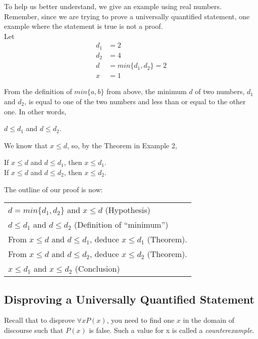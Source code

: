 To help us better understand, we give an example using real numbers.  Remember, since we are trying to prove a universally quantified statement, one example where the statement is true is not a proof.\\

Let
\begin{align*}
    d_1 &= 2\\
    d_2 &= 4\\
    d &= min\{d_1, d_2\} = 2\\
    x &= 1
\end{align*}

From the definition of $min\{a, b\}$ from above, the minimum $d$ of two numbers, $d_1$ and $d_2$, is equal to one of the two numbers and less than or equal to the other one.  In other words,
\begin{center}
    $d \leq d_1$ and $d \leq d_2$.  
\end{center}

We know that $x \leq d$, so, by the Theorem in Example 2,

\begin{center}
    If $x \leq d$ and $d \leq d_1$, then $x \leq d_1$.\\
    If $x \leq d$ and $d \leq d_2$, then $x \leq d_2$.
\end{center}

The outline of our proof is now:

\begin{table}[h]
\centering
\begin{tabular}{l}
$d = min\{d_1, d_2\}$ and $x \leq d$ (Hypothesis)\\
$d \leq d_1$ and $d \leq d_2$ (Definition of ``minimum'')\\
From $x \leq d$ and $d \leq d_1$, deduce $x \leq d_1$ (Theorem).\\
From $x \leq d$ and $d \leq d_2$, deduce $x \leq d_2$ (Theorem).\\
$x \leq d_1$ and $x \leq d_2$ (Conclusion)
\end{tabular}
\end{table}

\subsection*{Disproving a Universally Quantified Statement}

Recall that to disprove $\forall x P(x)$, you need to find one $x$ in the domain of discourse such that $P(x)$ is false.  Such a value for x is called a \textit{counterexample}.

